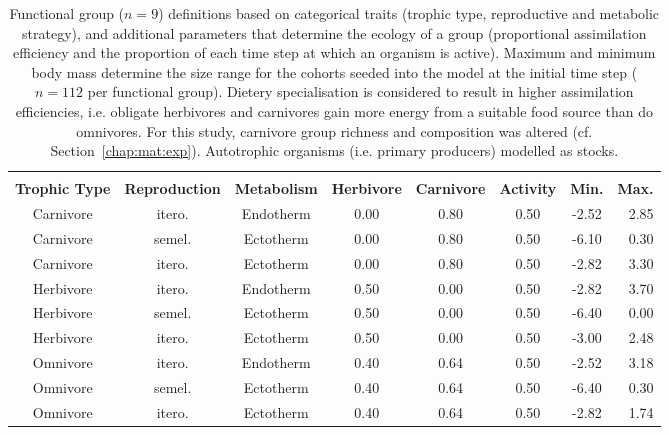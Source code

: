 \begin{sidewaystable}[htb!]
\centering
\caption[Functional group definitions]{Functional group ($n = 9$) definitions based on categorical traits (trophic type, reproductive and metabolic strategy),
               and additional parameters that determine the ecology of a group (proportional assimilation efficiency and the proportion of each time step
               at which an organism is active). Maximum and minimum body mass determine the size range for the cohorts seeded into the model at the initial time step ($n = 112$ per functional group). Dietery specialisation is considered to result in higher assimilation efficiencies, i.e. obligate herbivores and carnivores gain more energy from a suitable food source than do omnivores. For this study, carnivore group richness and composition was altered (cf. Section~\ref{chap:mat:exp}). Autotrophic organisms (i.e. primary producers) modelled as stocks.} 
\label{tab:mat:madingley:func}
\begin{tabulary}{\textwidth}{CCCCCCCR}
  \toprule
  & & &  & &  \\ \cmidrule(lr){4-5} \cmidrule(lr){7-8} 
\textbf{Trophic Type} & \textbf{Reproduction} & \textbf{Metabolism} & \textbf{Herbivore} & \textbf{Carnivore} & \textbf{Activity} & \textbf{Min.} & \textbf{Max.} \\ 
  \midrule
Carnivore & itero. & Endotherm & 0.00 & 0.80 & 0.50 & -2.52 & 2.85 \\ 
  Carnivore & semel. & Ectotherm & 0.00 & 0.80 & 0.50 & -6.10 & 0.30 \\ 
  Carnivore & itero. & Ectotherm & 0.00 & 0.80 & 0.50 & -2.82 & 3.30 \\ 
   [1ex]Herbivore & itero. & Endotherm & 0.50 & 0.00 & 0.50 & -2.82 & 3.70 \\ 
  Herbivore & semel. & Ectotherm & 0.50 & 0.00 & 0.50 & -6.40 & 0.00 \\ 
  Herbivore & itero. & Ectotherm & 0.50 & 0.00 & 0.50 & -3.00 & 2.48 \\ 
   [1ex]Omnivore & itero. & Endotherm & 0.40 & 0.64 & 0.50 & -2.52 & 3.18 \\ 
  Omnivore & semel. & Ectotherm & 0.40 & 0.64 & 0.50 & -6.40 & 0.30 \\ 
  Omnivore & itero. & Ectotherm & 0.40 & 0.64 & 0.50 & -2.82 & 1.74 \\ 
   \bottomrule
\end{tabulary}
\end{sidewaystable}
